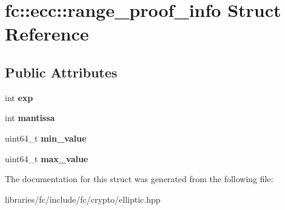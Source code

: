 \hypertarget{structfc_1_1ecc_1_1range__proof__info}{}\section{fc\+:\+:ecc\+:\+:range\+\_\+proof\+\_\+info Struct Reference}
\label{structfc_1_1ecc_1_1range__proof__info}
\subsection*{Public Attributes}
\begin{DoxyCompactItemize}
\item 
\mbox{\label{structfc_1_1ecc_1_1range__proof__info_ae21186b242154c836851983566b10767}} 
int {\bfseries exp}
\item 
\mbox{\label{structfc_1_1ecc_1_1range__proof__info_a65107ccfca589c1ebb5f8e9e707e0485}} 
int {\bfseries mantissa}
\item 
\mbox{\label{structfc_1_1ecc_1_1range__proof__info_a5f087eebe3170fc6322f833e94b7dba0}} 
uint64\+\_\+t {\bfseries min\+\_\+value}
\item 
\mbox{\label{structfc_1_1ecc_1_1range__proof__info_af97aa09524e4c339e5b52b1e5120d0df}} 
uint64\+\_\+t {\bfseries max\+\_\+value}
\end{DoxyCompactItemize}


The documentation for this struct was generated from the following file\+:\begin{DoxyCompactItemize}
\item 
libraries/fc/include/fc/crypto/elliptic.\+hpp\end{DoxyCompactItemize}
